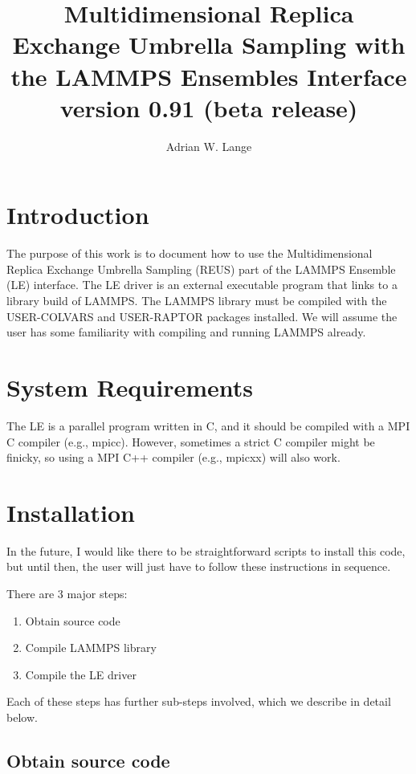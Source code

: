 \documentclass[10pt]{article}
\title{Multidimensional Replica Exchange Umbrella Sampling with the LAMMPS Ensembles Interface\\
\large version 0.91 (beta release)
}
\author{Adrian W. Lange}
\begin{document}
\maketitle

\section{Introduction}

The purpose of this work is to document how to use the Multidimensional Replica Exchange Umbrella
Sampling (REUS) part of the LAMMPS Ensemble (LE) interface. The LE driver
is an external executable program that links to a library build of LAMMPS. 
The LAMMPS library must be compiled with the 
USER-COLVARS and USER-RAPTOR packages installed.
We will assume the user has some familiarity with compiling and running LAMMPS already. 

\section{System Requirements}

The LE is a parallel program written in C, and it should be compiled
with a MPI C compiler (e.g., mpicc). However, sometimes a strict C compiler might be finicky,
so using a MPI C++ compiler (e.g., mpicxx) will also work.

\section{Installation}

In the future, I would like there to be straightforward scripts to install this code,
but until then, the user will just have to follow these instructions in sequence. 

There are 3 major steps:
\begin{enumerate}
	\item Obtain source code
	\item Compile LAMMPS library
	\item Compile the LE driver
\end{enumerate}
Each of these steps has further sub-steps involved, which we describe in detail below.

\subsection{Obtain source code}
\end{document}
